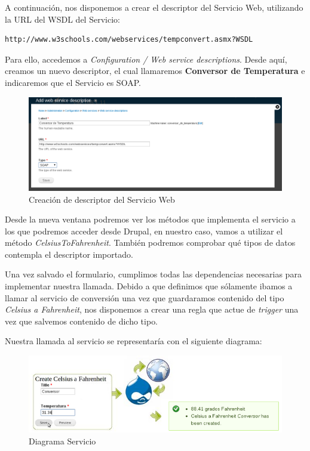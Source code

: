 A continuación, nos disponemos a crear el descriptor del Servicio Web, utilizando la URL del WSDL del Servicio:

\begin{verbatim}
http://www.w3schools.com/webservices/tempconvert.asmx?WSDL
\end{verbatim}

Para ello, accedemos a \textit{Configuration / Web service descriptions}.
Desde aquí, creamos un nuevo descriptor, el cual llamaremos \textbf{Conversor de Temperatura} e indicaremos que el Servicio es SOAP.

\begin{figure}[h]
  \centering
    \includegraphics[width=1\textwidth]{Assets/Soap/Imagenes/crear_descriptor_servicio.png}
  \caption{Creación de descriptor del Servicio Web}
\end{figure}

Desde la nueva ventana podremos ver los métodos que implementa el servicio a los que podremos acceder desde Drupal, 
en nuestro caso, vamos a utilizar el método \textit{CelsiusToFahrenheit}. También podremos comprobar qué tipos de 
datos contempla el descriptor importado. 

Una vez salvado el formulario, cumplimos todas las dependencias necesarias para implementar nuestra llamada. 
Debido a que definimos que sólamente ibamos a llamar al servicio de conversión una vez que guardaramos contenido del tipo 
\textit{Celsius a Fahrenheit}, nos disponemos a crear una regla que actue de \textit{trigger} una vez que salvemos contenido 
de dicho tipo.

Nuestra llamada al servicio se representaría con el siguiente diagrama:

\begin{figure}[h]
  \centering
    \includegraphics[width=1\textwidth]{Assets/Soap/Imagenes/diagrama_soap.png}
  \caption{Diagrama Servicio}
\end{figure}

